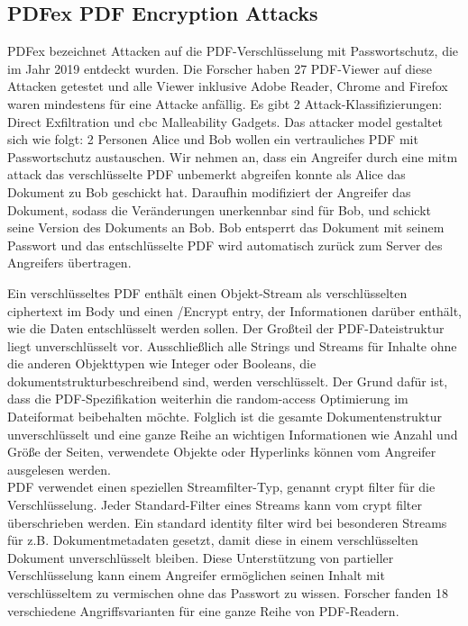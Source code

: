 \subsection{PDFex PDF Encryption Attacks}
PDFex bezeichnet Attacken auf die PDF-Verschlüsselung mit Passwortschutz, die im Jahr 2019 entdeckt wurden. Die Forscher haben 27 PDF-Viewer auf diese Attacken getestet und alle Viewer inklusive Adobe Reader, Chrome and Firefox waren mindestens für eine Attacke anfällig. Es gibt 2 Attack-Klassifizierungen: Direct Exfiltration und \gls{cbc} Malleability Gadgets.
Das attacker model gestaltet sich wie folgt: 2 Personen Alice und Bob wollen ein vertrauliches PDF mit Passwortschutz austauschen. Wir nehmen an, dass ein Angreifer durch eine \gls{mitm} attack das verschlüsselte PDF unbemerkt abgreifen konnte als Alice das Dokument zu Bob geschickt hat. Daraufhin modifiziert der Angreifer das Dokument, sodass die Veränderungen unerkennbar sind für Bob, und schickt seine Version des Dokuments an Bob. Bob entsperrt das Dokument mit seinem Passwort und das entschlüsselte PDF wird automatisch zurück zum Server des Angreifers übertragen. \cite{ccc-break-pdf, pdfex}
\par
Ein verschlüsseltes PDF enthält einen Objekt-Stream als verschlüsselten ciphertext im Body und einen /Encrypt entry, der Informationen darüber enthält, wie die Daten entschlüsselt werden sollen. Der Großteil der PDF-Dateistruktur liegt unverschlüsselt vor. Ausschließlich alle Strings und Streams für Inhalte ohne die anderen Objekttypen wie Integer oder Booleans, die dokumentstrukturbeschreibend sind, werden verschlüsselt. Der Grund dafür ist, dass die PDF-Spezifikation weiterhin die random-access Optimierung im Dateiformat beibehalten möchte. Folglich ist die gesamte Dokumentenstruktur unverschlüsselt und eine ganze Reihe an wichtigen Informationen wie Anzahl und Größe der Seiten, verwendete Objekte oder Hyperlinks können vom Angreifer ausgelesen werden. \\
PDF verwendet einen speziellen Streamfilter-Typ, genannt crypt filter für die Verschlüsselung. Jeder Standard-Filter eines Streams kann vom crypt filter überschrieben werden. Ein standard identity filter wird bei besonderen Streams für z.B. Dokumentmetadaten gesetzt, damit diese in einem verschlüsselten Dokument unverschlüsselt bleiben. Diese Unterstützung von partieller Verschlüsselung kann einem Angreifer ermöglichen seinen Inhalt mit verschlüsseltem zu vermischen ohne das Passwort zu wissen. Forscher fanden 18 verschiedene Angriffsvarianten für eine ganze Reihe von PDF-Readern. \cite{ccc-break-pdf}
